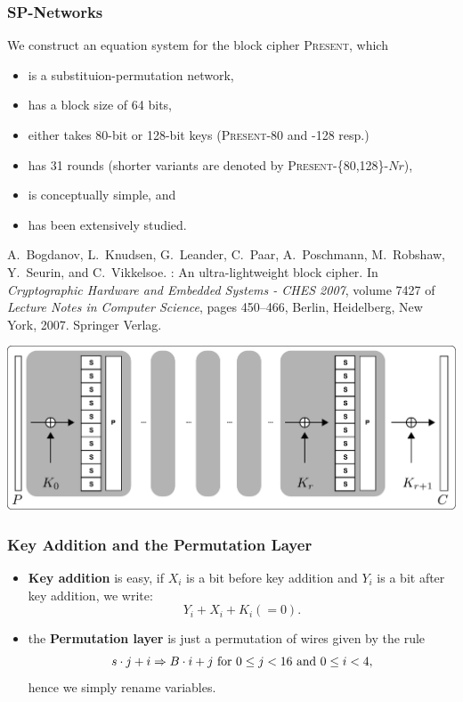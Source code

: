 \documentclass[9pt]{beamer}
\renewcommand{\emph}[1]{\textbf{\color{oxygenorange}#1}\xspace}
\newcommand{\PRESENT}{\textsc{Present}\xspace}
\begin{document}
\begin{frame}[allowframebreaks]
\frametitle{SP-Networks} 

We construct an equation system for the block cipher \PRESENT, which

\begin{itemize}
 \item is a substituion-permutation network,
 \item has a block size of 64 bits,
 \item either takes 80-bit or 128-bit keys (\PRESENT-80 and -128 resp.)
 \item has 31 rounds (shorter variants are denoted by \PRESENT-\{80,128\}-$Nr$),
 \item is conceptually simple, and
 \item has been extensively studied.
\end{itemize}

\begin{small}
\begin{thebibliography}{present}
A.\ Bogdanov, L.\ Knudsen, G.\ Leander, C.\ Paar, A.\ Poschmann, M.\ Robshaw, Y.\ Seurin, and C.\ Vikkelsoe.
: An ultra-lightweight block cipher.
\newblock In {\em Cryptographic Hardware and Embedded Systems - CHES 2007},
  volume 7427 of {\em Lecture Notes in Computer Science}, pages 450--466,
  Berlin, Heidelberg, New York, 2007. Springer Verlag.
\end{thebibliography}
\end{small}
\framebreak

\begin{center}
 \includegraphics[width=1.0\textwidth]{./spn-scheme.pdf}
\end{center}
\end{frame}

\begin{frame}
\frametitle{Key Addition and the Permutation Layer}

\begin{itemize}
  \item \emph{Key addition} is easy, if $X_i$ is a bit before key addition and $Y_i$ is a bit after key addition, we write:
\[Y_i + X_i + K_i (=0).\]
  \item the \emph{Permutation layer} is just a permutation of wires given by the rule
\[s \cdot j + i \Rightarrow  B \cdot i + j \textnormal{ for } 0 \leq j < 16 \textnormal{ and } 0 \leq i < 4,\] hence we simply rename variables.
\end{itemize}

\end{frame}
\end{document}
